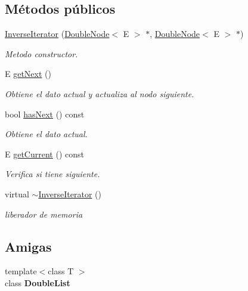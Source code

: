 \subsection*{Métodos públicos}
\begin{DoxyCompactItemize}
\item 
\hyperlink{classInverseIterator_a31703976cbdca73a1035f47509e8229d}{Inverse\-Iterator} (\hyperlink{classDoubleNode}{Double\-Node}$<$ E $>$ $\ast$, \hyperlink{classDoubleNode}{Double\-Node}$<$ E $>$ $\ast$)
\begin{DoxyCompactList}\small\item\em Metodo constructor. \end{DoxyCompactList}\item 
E \hyperlink{classInverseIterator_a4c1d8ceb8264f7f8186b6244a0a62940}{get\-Next} ()
\begin{DoxyCompactList}\small\item\em Obtiene el dato actual y actualiza al nodo siguiente. \end{DoxyCompactList}\item 
bool \hyperlink{classInverseIterator_a86973781dfa84df67be2843fc4545692}{has\-Next} () const 
\begin{DoxyCompactList}\small\item\em Obtiene el dato actual. \end{DoxyCompactList}\item 
E \hyperlink{classInverseIterator_afdbb5c310621c773da10dfb5bc3b1a4c}{get\-Current} () const 
\begin{DoxyCompactList}\small\item\em Verifica si tiene siguiente. \end{DoxyCompactList}\item 
\hypertarget{classInverseIterator_ae3b6736187c1dbc82ead0277d31e5898}{virtual \hyperlink{classInverseIterator_ae3b6736187c1dbc82ead0277d31e5898}{$\sim$\-Inverse\-Iterator} ()}\label{classInverseIterator_ae3b6736187c1dbc82ead0277d31e5898}

\begin{DoxyCompactList}\small\item\em liberador de memoria \end{DoxyCompactList}\end{DoxyCompactItemize}
\subsection*{Amigas}
\begin{DoxyCompactItemize}
\item 
\hypertarget{classInverseIterator_ad435a9844a002995926acf522128f7a8}{{\footnotesize template$<$class T $>$ }\\class {\bfseries Double\-List}}\label{classInverseIterator_ad435a9844a002995926acf522128f7a8}

\end{DoxyCompactItemize}


